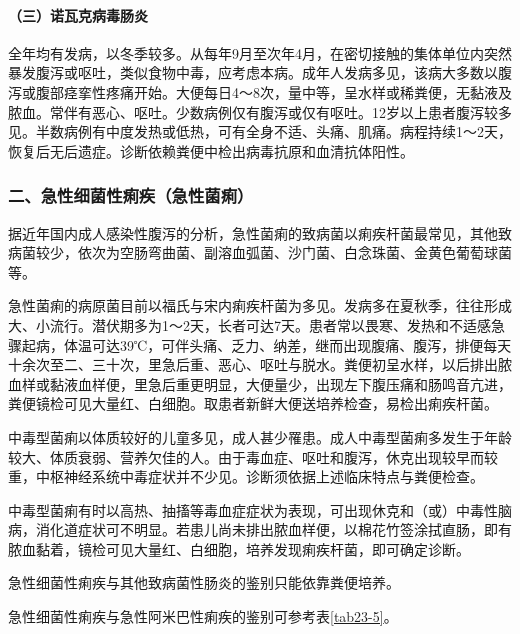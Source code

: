 \paragraph{（三）诺瓦克病毒肠炎}

全年均有发病，以冬季较多。从每年9月至次年4月，在密切接触的集体单位内突然暴发腹泻或呕吐，类似食物中毒，应考虑本病。成年人发病多见，该病大多数以腹泻或腹部痉挛性疼痛开始。大便每日4～8次，量中等，呈水样或稀粪便，无黏液及脓血。常伴有恶心、呕吐。少数病例仅有腹泻或仅有呕吐。12岁以上患者腹泻较多见。半数病例有中度发热或低热，可有全身不适、头痛、肌痛。病程持续1～2天，恢复后无后遗症。诊断依赖粪便中检出病毒抗原和血清抗体阳性。

\subsubsection{二、急性细菌性痢疾（急性菌痢）}

据近年国内成人感染性腹泻的分析，急性菌痢的致病菌以痢疾杆菌最常见，其他致病菌较少，依次为空肠弯曲菌、副溶血弧菌、沙门菌、白念珠菌、金黄色葡萄球菌等。

急性菌痢的病原菌目前以福氏与宋内痢疾杆菌为多见。发病多在夏秋季，往往形成大、小流行。潜伏期多为1～2天，长者可达7天。患者常以畏寒、发热和不适感急骤起病，体温可达39℃，可伴头痛、乏力、纳差，继而出现腹痛、腹泻，排便每天十余次至二、三十次，里急后重、恶心、呕吐与脱水。粪便初呈水样，以后排出脓血样或黏液血样便，里急后重更明显，大便量少，出现左下腹压痛和肠鸣音亢进，粪便镜检可见大量红、白细胞。取患者新鲜大便送培养检查，易检出痢疾杆菌。

中毒型菌痢以体质较好的儿童多见，成人甚少罹患。成人中毒型菌痢多发生于年龄较大、体质衰弱、营养欠佳的人。由于毒血症、呕吐和腹泻，休克出现较早而较重，中枢神经系统中毒症状并不少见。诊断须依据上述临床特点与粪便检查。

中毒型菌痢有时以高热、抽搐等毒血症症状为表现，可出现休克和（或）中毒性脑病，消化道症状可不明显。若患儿尚未排出脓血样便，以棉花竹签涂拭直肠，即有脓血黏着，镜检可见大量红、白细胞，培养发现痢疾杆菌，即可确定诊断。

急性细菌性痢疾与其他致病菌性肠炎的鉴别只能依靠粪便培养。

急性细菌性痢疾与急性阿米巴性痢疾的鉴别可参考表\ref{tab23-5}。

